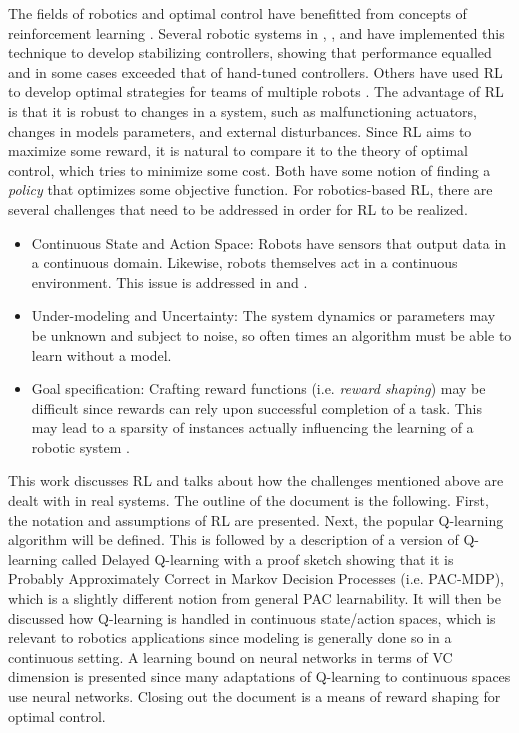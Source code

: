 \documentclass{article} %
\begin{document}
The fields of robotics and optimal control have benefitted from concepts of reinforcement learning \cite{kaelbling_reinforcement_1996} \cite{kober_reinforcement_2013}. Several robotic systems in  \cite{bhasin_reinforcement_2011}, \cite{hester_rtmba:_2012}, and  \cite{kim_autonomous_2003} have implemented this technique to develop stabilizing controllers, showing that performance equalled and in some cases exceeded that of hand-tuned controllers. Others have used RL to develop optimal strategies for teams of multiple robots \cite{yang_multiagent_2004}.  The advantage of RL is that it is robust to changes in a system, such as malfunctioning actuators, changes in models parameters, and external disturbances. Since RL aims to maximize some reward, it is natural to compare it to the theory of optimal control, which tries to minimize some cost.  Both have some notion of finding a \textit{policy} that optimizes some objective function. For robotics-based RL, there are several challenges that need to be addressed in order for RL to be realized.
\begin{itemize}
\item Continuous State and Action Space: Robots have sensors that output data in a continuous domain.  Likewise, robots themselves act in a continuous environment. This issue is addressed in \cite{gaskett_thesis} and \cite{q_learning_navigation}.
\item Under-modeling and Uncertainty: The system dynamics or parameters may be unknown and subject to noise, so often times an algorithm must be able to learn without a model.
\item Goal specification: Crafting reward functions (i.e. \textit{reward shaping}) may be difficult since rewards can rely upon successful completion of a task. This may lead to a sparsity of instances actually influencing the learning of a robotic system \cite{ng_thesis}.
\end{itemize}

This work discusses RL and talks about how the challenges mentioned above are dealt with in real systems. The outline of the document is the following. First, the notation and assumptions of RL are presented. Next, the popular Q-learning algorithm will be defined.  This is followed by a description of a version of Q-learning called Delayed Q-learning with a proof sketch showing that it is Probably Approximately Correct in Markov Decision Processes (i.e. PAC-MDP), which is a slightly different notion from general PAC learnability. It will then be discussed how Q-learning is handled in continuous state/action spaces, which is relevant to robotics applications since modeling is generally done so in a continuous setting. A learning bound on neural networks in terms of VC dimension is presented since many adaptations of Q-learning to continuous spaces use neural networks. Closing out the document is a means of reward shaping for optimal control.
\end{document}
